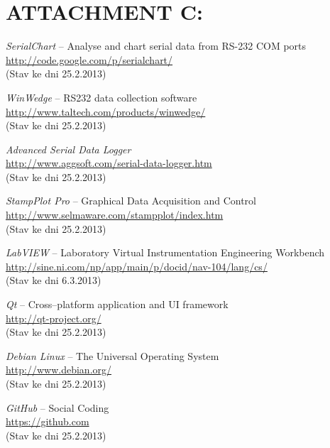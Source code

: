\documentclass[12pt, a4paper, oneside]{article}
\newcommand{\It}{\textit}  %
\begin{document}
 \section*{ATTACHMENT C:}
 \begin{thebibliography}{99}

     \It{SerialChart} -- Analyse and chart serial data from RS-232 COM ports \\
    \url{http://code.google.com/p/serialchart/}\\
    (Stav ke dni 25.2.2013)

     \It{WinWedge} -- RS232 data collection software \\
    \url{http://www.taltech.com/products/winwedge/}\\
    (Stav ke dni 25.2.2013)

     \It{Advanced Serial Data Logger} \\
    \url{http://www.aggsoft.com/serial-data-logger.htm}\\
    (Stav ke dni 25.2.2013)

     \It{StampPlot Pro} -- Graphical Data Acquisition and Control \\
    \url{http://www.selmaware.com/stampplot/index.htm}\\
    (Stav ke dni 25.2.2013)

     \It{LabVIEW} -- Laboratory Virtual Instrumentation Engineering Workbench \\
    \url{http://sine.ni.com/np/app/main/p/docid/nav-104/lang/cs/}\\
    (Stav ke dni 6.3.2013)

     \It{Qt} -- Cross--platform application and UI framework \\
    \url{http://qt-project.org/}\\
    (Stav ke dni 25.2.2013)

     \It{Debian Linux} -- The Universal Operating System \\
    \url{http://www.debian.org/}\\
    (Stav ke dni 25.2.2013)

     \It{GitHub} -- Social Coding \\
    \url{https://github.com}\\
    (Stav ke dni 25.2.2013)


\end{thebibliography}
\end{document}
